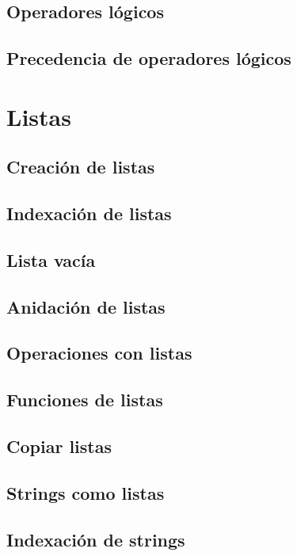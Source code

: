 \documentclass{article}
\begin{document}
\subsection{Operadores lógicos}

\subsection{Precedencia de operadores lógicos}

\section{Listas}

\subsection{Creación de listas}

\subsection{Indexación de listas}

\subsection{Lista vacía}

\subsection{Anidación de listas}

\subsection{Operaciones con listas}

\subsection{Funciones de listas}

\subsection{Copiar listas}

\subsection{Strings como listas}

\subsection{Indexación de strings}
\end{document}
